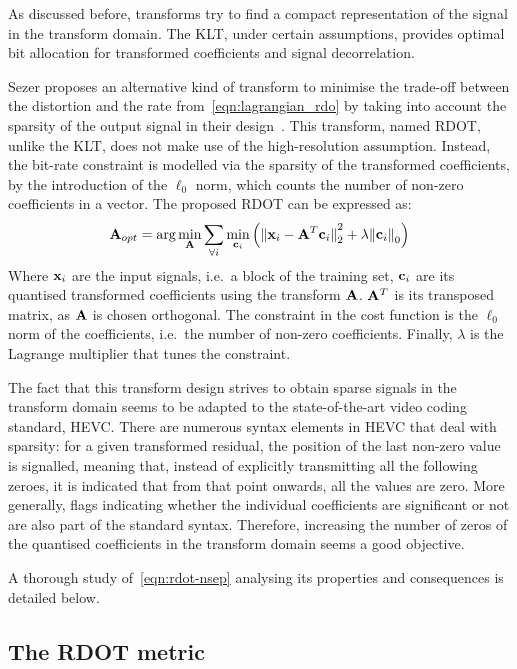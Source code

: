 \documentclass[11pt,a4paper,openright,twoside]{book}
\numberwithin{equation}{section} %
\numberwithin{figure}{section} %
\numberwithin{table}{section} %
\begin{document}
As discussed before, transforms try to find a compact representation of the
signal in the transform domain.
The \ac{KLT}, under certain assumptions, provides optimal bit allocation for
transformed coefficients and signal decorrelation.

Sezer proposes an alternative kind of transform to minimise the trade-off
between the distortion and the rate from~\eqref{eqn:lagrangian_rdo} by taking
into account the sparsity of the output signal in their
design~\cite{sezer-11-phd,sezer-08-sparse-orthonormal-transforms}.
This transform, named \ac{RDOT}, unlike the \ac{KLT}, does not make use
of the high-resolution assumption.
Instead, the bit-rate constraint is modelled via the sparsity of the
transformed coefficients, by the introduction of the $\ell_0$ norm, which
counts the number of non-zero coefficients in a vector.
The proposed \ac{RDOT} can be expressed as:
\begin{equation}
	\mathbf{A}_{opt} = \text{arg}\min\limits_{\mathbf{A}}
	\sum_{\forall i} \min\limits_{\mathbf{c}_i}
	\left(
	{\Vert \mathbf{x}_i - \mathbf{A}^T\mathbf{c}_i \Vert}_2^2 + \lambda{\Vert \mathbf{c}_i \Vert}_0
	\right)
	\label{eqn:rdot-nsep}
\end{equation}
Where $\mathbf{x}_i$ are the input signals, i.e.\ a block of the training set,
$\mathbf{c}_i$ are its quantised transformed coefficients using the transform
$\mathbf{A}$.
$\mathbf{A}^T$ is its transposed matrix, as $\mathbf{A}$ is chosen orthogonal.
The constraint in the cost function is the $\ell_0$ norm of the coefficients,
i.e.\ the number of non-zero coefficients.
Finally, $\lambda$ is the Lagrange multiplier that tunes the constraint.

The fact that this transform design strives to obtain sparse signals in the
transform domain seems to be adapted to the state-of-the-art video coding
standard, \ac{HEVC}.
There are numerous syntax elements in \ac{HEVC} that deal with sparsity:
for a given transformed residual, the position of the last non-zero value is
signalled, meaning that, instead of explicitly transmitting all the following
zeroes, it is indicated that from that point onwards, all the values are zero.
More generally, flags indicating whether the individual coefficients are
significant or not are also part of the standard syntax.
Therefore, increasing the number of zeros of the quantised coefficients in the
transform domain seems a good objective.

A thorough study of~\eqref{eqn:rdot-nsep} analysing its properties and
consequences is detailed below.

\subsection{The \acs{RDOT} metric}
\label{sub:the_rdot_metric}
\end{document}
